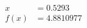\documentclass[preview]{standalone}
\begin{document}
\begin{align*}
x &= 0.5293\\f(x) &= 4.8810977
\end{align*}
\end{document}
